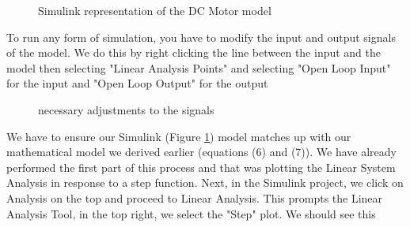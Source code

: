 \begin{figure}[H]
\centering
{}
\caption{\label{fig:code_speed_simu} Simulink representation of the DC Motor model}
\end{figure}

To run any form of simulation, you have to modify the input and output signals of the model. We do this by right clicking the line between the input and the model then selecting "Linear Analysis Points" and selecting "Open Loop Input" for the input and "Open Loop Output" for the output
\begin{figure}[H]
\centering
{}
\caption{\label{fig:code_speed2} necessary adjustments to the signals}
\end{figure}

\noindent We have to ensure our Simulink (Figure \ref{fig:code_speed_simu}) model matches up with our mathematical model we derived earlier (equations (6) and (7)). We have already performed the first part of this process and that was plotting the Linear System Analysis in response to a step function. Next, in the Simulink project, we click on Analysis on the top and proceed to Linear Analysis. This prompts the Linear Analysis Tool, in the top right, we select the "Step" plot. We should see this 

